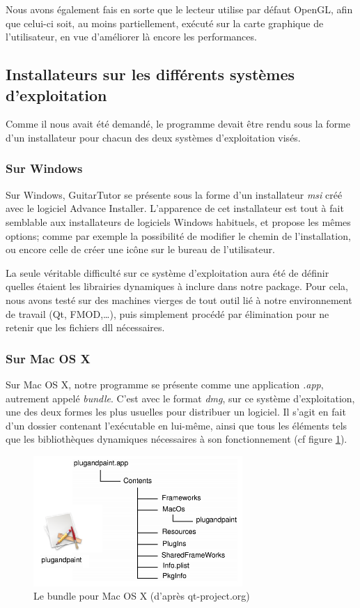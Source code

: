 \documentclass[a4paper,11pt]{article}
\begin{document}
Nous avons également fais en sorte que le lecteur utilise par défaut OpenGL, afin que celui-ci soit, au moins partiellement, exécuté sur la carte graphique de l'utilisateur, en vue d'améliorer là encore les performances.

\subsection{Installateurs sur les différents systèmes d'exploitation}

Comme il nous avait été demandé, le programme devait être rendu sous la forme d'un installateur pour chacun des deux systèmes d'exploitation visés.

\subsubsection{Sur Windows}

Sur Windows, GuitarTutor se présente sous la forme d'un installateur \textit{msi} créé avec le logiciel Advance Installer. L'apparence de cet installateur est tout à fait semblable aux installateurs de logiciels Windows habituels, et propose les mêmes options; comme par exemple la possibilité de modifier le chemin de l'installation, ou encore celle de créer une icône sur le bureau de l'utilisateur.

La seule véritable difficulté sur ce système d'exploitation aura été de définir quelles étaient les librairies dynamiques à inclure dans notre package. Pour cela, nous avons testé sur des machines vierges de tout outil lié à notre environnement de travail (Qt, FMOD,\dots), puis simplement procédé par élimination pour ne retenir que les fichiers dll nécessaires.

\subsubsection{Sur Mac OS X}

Sur Mac OS X, notre programme se présente comme une application \textit{.app}, autrement appelé \textit{bundle}. C'est avec le format \textit{dmg}, sur ce système d'exploitation, une des deux formes les plus usuelles pour distribuer un logiciel. Il s'agit en fait d'un dossier contenant l'exécutable en lui-même, ainsi que tous les éléments tels que les bibliothèques dynamiques nécessaires à son fonctionnement (cf figure \ref{app_mac_os}).

\begin{figure}[H]
\begin{center}
\includegraphics[width=300px]{bundle_mac.png}
\caption{Le bundle pour Mac OS X (d'après qt-project.org)}
\label{app_mac_os}
\end{center}
\end{figure}
\end{document}
